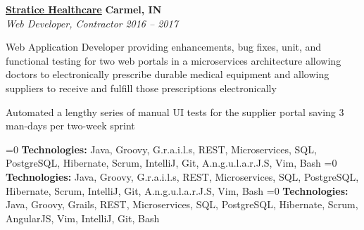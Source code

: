 %
    \headerrow
        {\textbf{\href{https://www.straticehealthcare.com/}{Stratice Healthcare}}}
        {\textbf{Carmel, IN}}
    \\
    \headerrow
        {\emph{Web Developer, Contractor}}
        {\emph{2016 -- 2017}}
    \begin{itemize*}
        \item Web Application Developer providing enhancements, bug fixes, unit, and functional testing for two
            web portals in a microservices architecture allowing doctors to electronically prescribe durable medical equipment and
            allowing suppliers to receive and fulfill those prescriptions electronically
        \item Automated a lengthy series of manual UI tests for the supplier portal saving 3 man-days per two-week sprint
    \end{itemize*}

    \ifnum{}=0
    \hspace{1.0em}
        {\textbf{Technologies:} Java, Groovy, G.r.a.i.l.s, REST, Microservices, SQL, PostgreSQL, Hibernate, Scrum, IntelliJ, Git,
        A.n.g.u.l.a.r.J.S, Vim, Bash}
    \fi
    \ifnum{}=0
    \hspace{1.0em}
        {\textbf{Technologies:} Java, Groovy, G.r.a.i.l.s, REST, Microservices, SQL, PostgreSQL, Hibernate, Scrum, IntelliJ, Git,
        A.n.g.u.l.a.r.J.S, Vim, Bash}
    \fi
    \ifnum{}=0
    \hspace{1.0em}
        {\textbf{Technologies:} Java, Groovy, Grails, REST, Microservices, SQL, PostgreSQL, Hibernate, Scrum, AngularJS, Vim, IntelliJ, Git, Bash}
    \fi
